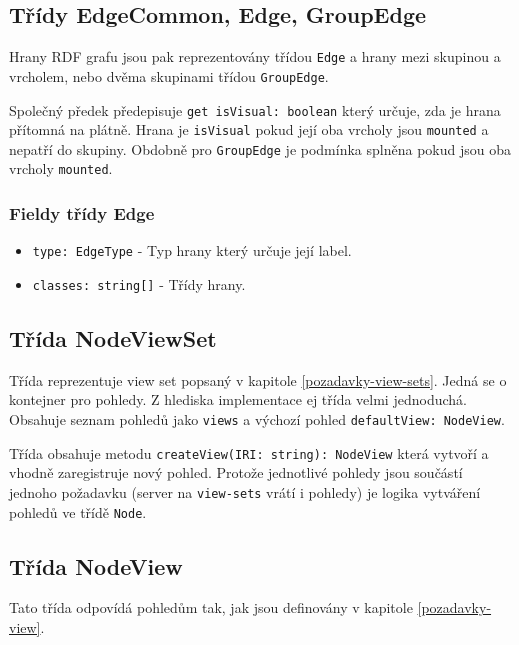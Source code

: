 \subsection{Třídy EdgeCommon, Edge, GroupEdge}
Hrany RDF grafu jsou pak reprezentovány třídou \texttt{Edge} a hrany mezi skupinou a vrcholem, nebo dvěma skupinami třídou \texttt{GroupEdge}.

Společný předek předepisuje \texttt{get isVisual: boolean} který určuje, zda je hrana přítomná na plátně. Hrana je \texttt{isVisual} pokud její oba vrcholy jsou \texttt{mounted} a nepatří do skupiny. Obdobně pro \texttt{GroupEdge} je podmínka splněna pokud jsou oba vrcholy \texttt{mounted}.

\subsubsection*{Fieldy třídy Edge}
\begin{itemize}
  \item \texttt{type: EdgeType} - Typ hrany který určuje její label.
  \item \texttt{classes: string[]} - Třídy hrany.
\end{itemize}

\subsection{Třída NodeViewSet}
Třída reprezentuje view set popsaný v kapitole \ref{pozadavky-view-sets}. Jedná se o kontejner pro pohledy. Z hlediska implementace ej třída velmi jednoduchá. Obsahuje seznam pohledů jako \texttt{views} a výchozí pohled \texttt{defaultView: NodeView}.

Třída obsahuje metodu \texttt{createView(IRI: string): NodeView} která vytvoří a vhodně zaregistruje nový pohled. Protože jednotlivé pohledy jsou součástí jednoho požadavku (server na \texttt{view-sets} vrátí i pohledy) je logika vytváření pohledů ve třídě \texttt{Node}.

\subsection{Třída NodeView}
Tato třída odpovídá pohledům tak, jak jsou definovány v kapitole \ref{pozadavky-view}.

